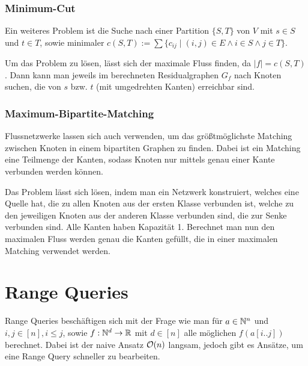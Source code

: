 \subsubsection{Minimum-Cut}
Ein weiteres Problem ist die Suche nach einer Partition \(\{S,T\}\) von \(V\) mit \(s \in S\) und \(t \in T\), sowie minimaler \(c(S, T) := \sum\{c_{ij} \mid (i,j) \in E \wedge i \in S \wedge j \in T\}\).

Um das Problem zu lösen, lässt sich der maximale Fluss finden, da \(|f| = c(S,T)\).
Dann kann man jeweils im berechneten Residualgraphen \(G_f\) nach Knoten suchen, die von \(s\) bzw. \(t\) (mit umgedrehten Kanten) erreichbar sind.

\subsubsection{Maximum-Bipartite-Matching}
Flussnetzwerke lassen sich auch verwenden, um das größtmöglichste Matching zwischen Knoten in einem bipartiten Graphen zu finden.
Dabei ist ein Matching eine Teilmenge der Kanten, sodass Knoten nur mittels genau einer Kante verbunden werden können.

Das Problem lässt sich lösen, indem man ein Netzwerk konstruiert, welches eine Quelle hat, die zu allen Knoten aus der ersten Klasse verbunden ist, welche zu den jeweiligen Knoten aus der anderen Klasse verbunden sind, die zur Senke verbunden sind.
Alle Kanten haben Kapazität 1.
Berechnet man nun den maximalen Fluss werden genau die Kanten gefüllt, die in einer maximalen Matching verwendet werden.

\section{Range Queries}
Range Queries beschäftigen sich mit der Frage wie man für \(a \in \mathbb N^n\) und \(i,j \in [n], i \le j\), sowie \(f: \mathbb N^d \rightarrow \mathbb R\) mit \(d \in [n]\) alle möglichen \(f(a[i..j])\) berechnet.
Dabei ist der naive Ansatz \(\mathcal O(n)\) langsam, jedoch gibt es Ansätze, um eine Range Query schneller zu bearbeiten.


